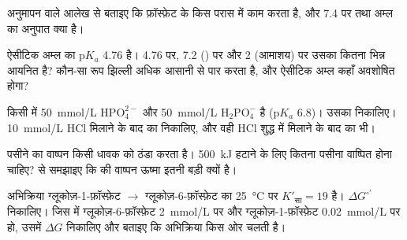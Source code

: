 \begin{exercise}[$\star$]\label{exo:b1:water-small-molecules:4}
अनुमापन वाले आलेख से बताइए कि फ़ॉस्फ़ेट   के किस परास में काम करता
है, और  7.4 पर  तथा अम्ल का अनुपात क्या है।
\end{exercise}

\begin{exercise}[$\star\star$]\label{exo:b1:water-small-molecules:5}
ऐसीटिक अम्ल का p$K_a$ 4.76 है।  4.76 पर,  7.2 () पर और
 2 (आमाशय) पर उसका कितना भिन्न आयनित है? कौन-सा रूप झिल्ली अधिक आसानी
से पार करता है, और ऐसीटिक अम्ल कहाँ अवशोषित होगा?
\end{exercise}

\begin{exercise}[$\star\star$]\label{exo:b1:water-small-molecules:6}
किसी  में \qty{50}{mmol/L} $\mathrm{HPO_4^{2-}}$ और
\qty{50}{mmol/L} $\mathrm{H_2PO_4^-}$ है (p$K_a$ 6.8)। उसका 
निकालिए। \qty{10}{mmol/L} HCl मिलाने के बाद का  निकालिए, और वही HCl
शुद्ध  में मिलाने के बाद का भी।
\end{exercise}

\begin{exercise}[$\star\star$]\label{exo:b1:water-small-molecules:7}
पसीने का वाष्पन किसी धावक को ठंडा करता है। \qty{500}{kJ} हटाने के लिए
कितना पसीना वाष्पित होना चाहिए?  से समझाइए कि  की
वाष्पन ऊष्मा इतनी बड़ी क्यों है।
\end{exercise}

\begin{exercise}[$\star\star$]\label{exo:b1:water-small-molecules:8}
अभिक्रिया ग्लूकोज़-1-फ़ॉस्फ़ेट $\to$ ग्लूकोज़-6-फ़ॉस्फ़ेट का
\qty{25}{\celsius} पर $K'_{\text{सा}} = 19$ है।
$\Delta G^{\circ\prime}$ निकालिए। जिस  में
ग्लूकोज़-6-फ़ॉस्फ़ेट \qty{2}{mmol/L} पर और ग्लूकोज़-1-फ़ॉस्फ़ेट
\qty{0.02}{mmol/L} पर हो, उसमें $\Delta G$ निकालिए और बताइए कि
अभिक्रिया किस ओर चलती है।
\end{exercise}

